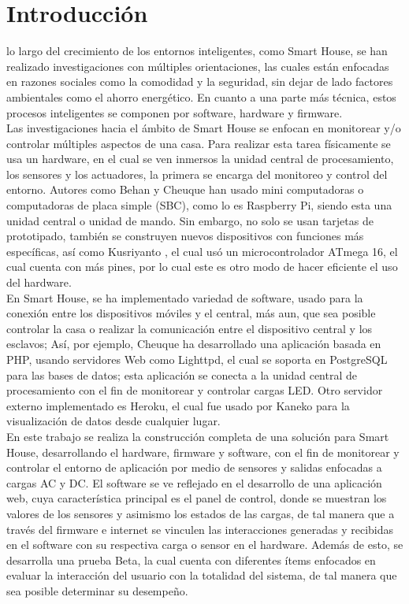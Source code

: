 \section{Introducción}

  lo largo del crecimiento de los entornos inteligentes, como Smart House, se han realizado investigaciones con múltiples orientaciones, las cuales están enfocadas en razones sociales como la comodidad y la seguridad, sin dejar de lado factores ambientales como el ahorro energético. En cuanto a una parte más técnica, estos procesos inteligentes se componen por software, hardware y firmware.\\ 
 
 Las investigaciones hacia el ámbito de Smart House se enfocan en monitorear y/o controlar múltiples aspectos de una casa. Para realizar esta tarea físicamente se usa un hardware, en el cual se ven inmersos la unidad central de procesamiento, los sensores y los actuadores, la primera se encarga del monitoreo y control del entorno. Autores como Behan \cite{Behan2013} y Cheuque \cite{Cheuque2015} han usado mini computadoras o computadoras de placa simple (SBC), como lo es Raspberry Pi, siendo esta una unidad central o unidad de mando. Sin embargo, no solo se usan tarjetas de prototipado, también se construyen nuevos dispositivos con funciones más específicas, así como Kusriyanto \cite{Kusriyanto2015}, el cual usó un microcontrolador ATmega 16, el cual cuenta con más pines, por lo cual este es otro modo de hacer eficiente el uso del hardware.\\ 
 
 En Smart House, se ha implementado variedad de software, usado para la conexión entre los dispositivos móviles y el central, más aun, que sea posible controlar la casa o realizar la comunicación entre el dispositivo central y los esclavos; Así, por ejemplo, Cheuque \cite{Cheuque2015} ha desarrollado una aplicación basada en PHP, usando servidores Web como Lighttpd, el cual se soporta en PostgreSQL para las bases de datos; esta aplicación se conecta a la unidad central de procesamiento con el fin de monitorear y controlar cargas LED. Otro servidor externo implementado es Heroku, el cual fue usado por Kaneko \cite{Kaneko2017} para la visualización de datos desde cualquier lugar.\\ 
 
 En este trabajo se realiza la construcción completa de una solución para Smart House, desarrollando el hardware, firmware y software, con el fin de monitorear y controlar el entorno de aplicación por medio de sensores y salidas enfocadas a cargas AC y DC. El software se ve reflejado en el desarrollo de una aplicación web, cuya característica principal es el panel de control, donde se muestran los valores de los sensores y asimismo los estados de las cargas, de tal manera que a través del firmware e internet se vinculen las interacciones generadas y recibidas en el software con su respectiva carga o sensor en el hardware. Además de esto, se desarrolla una prueba Beta, la cual cuenta con diferentes ítems enfocados en evaluar la interacción del usuario con la totalidad del sistema, de tal manera que sea posible determinar su desempeño.\\ 
 
